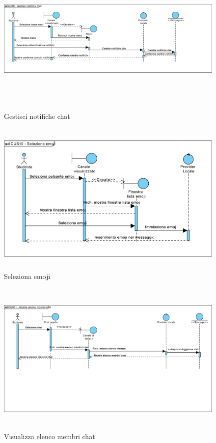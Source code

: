 \begin{figure}
	\centering
	\includegraphics[height=3in,width=5in]{imgs/gruppo6/sequence/CUS9_gestisci_notifiche_chat.pdf}
	\caption{Gestisci notifiche chat}
	\label{fig:prova}
\end{figure}

\begin{figure}
	\centering
	\includegraphics[height=3in,width=5in]{imgs/gruppo6/sequence/CUS10_selezione_emoji.pdf}
	\caption{Seleziona emoji}
	\label{fig:prova}
\end{figure}

\begin{figure}
	\centering
	\includegraphics[height=3in,width=5in]{imgs/gruppo6/sequence/CUS11_visualizza_elenco_membri_chat.pdf}
	\caption{Visualizza elenco membri chat}
	\label{fig:prova}
\end{figure}

